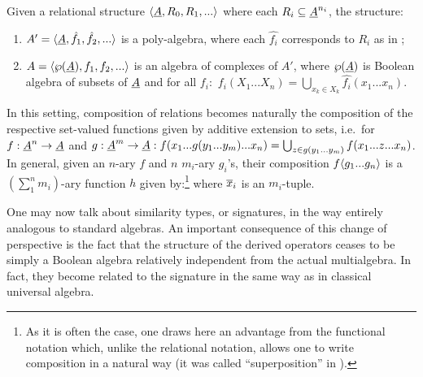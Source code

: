 \documentclass[10pt]{article}
\begin{document}
\begin{Definition}
\label{de:cmplx}
Given a relational structure $\langle\underline {A},R_0,R_1,...\rangle$ where each
$R_i\subseteq \underline {A}^{n_{i}}$, the structure:
%
\begin{enumerate}\MyLPar
\item 
$A'=\langle\underline {A},\hat{f_1},\hat{f_2},...\rangle$ is a poly-algebra,
where each $\hat{f_i}$ corresponds to $R_i$ as in ;
\item 
$A=\langle\wp(\underline {A}),f_1,f_2,...\rangle$ is an algebra of complexes of
$A'$, where $\wp(\underline {A})$ is Boolean algebra of subsets of $\underline {A}$ and for all $f_i:$ $f_i(X_1...X_n)=\bigcup_{x_{k}\in X_{k}}
\hat{f_i}(x_1...x_n)$.
\end{enumerate}
\end{Definition}
%
In this setting, composition of relations becomes
naturally the composition of the respective set-valued functions given
by additive extension to sets, i.e.\ for $f:\underline {A}^n\rightarrow\underline {A}$
and $g:\underline {A}^m\rightarrow\underline {A}: f(x_1...g(y_1...y_m)...x_n) =
\bigcup_{z\in g(y_{1}...y_{m})} f(x_1...z...x_n)$.  In general, given
an $n$-ary $f$ and $n$ $m_i$-ary $g_i$'s, their composition
$f\langle g_1...g_n\rangle$ is a $(\sum_1^n m_i)$-ary function $h$ given 
by:\footnote{As it is often the case, one draws here an advantage from
the functional notation which, unlike the relational notation, allows
one to write composition in a natural way (it was called
``superposition'' in \cite{JT1}).}
%
where $\overline {x}_i$ is an $m_i$-tuple.
 
One may now talk about similarity types, or signatures, 
in the way entirely analogous to standard algebras. 
%
An important consequence of this change of perspective is the
fact that the structure of the derived operators ceases to be simply
a Boolean algebra relatively independent from the actual
multialgebra. In fact, they become related to the signature in the
same way as in classical universal algebra.
\end{document}
